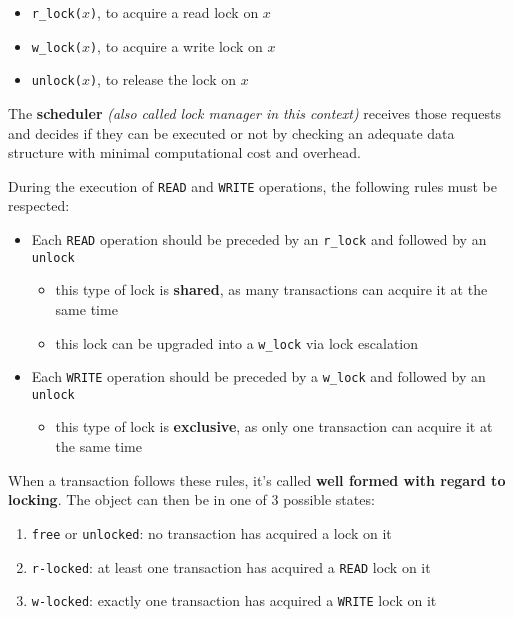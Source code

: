 \documentclass[english]{article}
\begin{document}
\begin{itemize}
  \item \texttt{r\_lock(\(x\))}, to acquire a read lock on \(x\)
  \item \texttt{w\_lock(\(x\))}, to acquire a write lock on \(x\)
  \item \texttt{unlock(\(x\))}, to release the lock on \(x\)
\end{itemize}

The \textbf{scheduler} \textit{(also called lock manager in this context)} receives those requests and decides if they can be executed or not by checking an adequate data structure with minimal computational cost and overhead.

During the execution of \texttt{READ} and \texttt{WRITE} operations, the following rules must be respected:

\begin{itemize}
  \item Each \texttt{READ} operation should be preceded by an \texttt{r\_lock} and followed by an \texttt{unlock}
        \begin{itemize}
          \item this type of lock is \textbf{shared}, as many transactions can acquire it at the same time
          \item this lock can be upgraded into a \texttt{w\_lock} via lock escalation
        \end{itemize}
  \item Each \texttt{WRITE} operation should be preceded by a \texttt{w\_lock} and followed by an \texttt{unlock}
        \begin{itemize}
          \item this type of lock is \textbf{exclusive}, as only one transaction can acquire it at the same time
        \end{itemize}
\end{itemize}

When a transaction follows these rules, it's called \textbf{well formed with regard to locking}.
The object can then be in one of \(3\) possible states:

\begin{enumerate}
  \item \texttt{free} or \texttt{unlocked}: no transaction has acquired a lock on it
  \item \texttt{r-locked}: at least one transaction has acquired a \texttt{READ} lock on it
  \item \texttt{w-locked}: exactly one transaction has acquired a \texttt{WRITE} lock on it
\end{enumerate}
\end{document}
